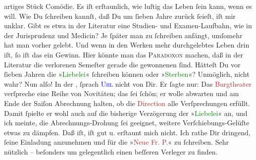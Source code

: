                artiges Stück Comödie. Es iſt erſtaunlich, wie luſtig das Leben ſein kann, wenn {\pb}es will.\pend
           \pstart
           Wie Du ſchreiben kannſt, daß Du um ſieben Jahre zurück ſeieſt, iſt mir unklar. Gibt
               es etwa in der Literatur eine Studien- und Examen-Laufbahn, wie in der Jurisprudenz
               und Medicin? Je ſpäter man zu ſchreiben anfängt, umſomehr hat man vorher gelebt. Und
               wenn in den Werken mehr durchgelebtes Leben drin iſt, ſo iſt das ein Gewinn. Hier
               könnte man das \textsc{Paradoxon} machen, daß in der Literatur die
               verlorenen Semeſter gerade die gewonnenen ſind. Hätteſt Du vor ſieben Jahren {\pb}die »\textcolor{green}{Liebelei}{}\ledrightnote{\textcolor{green}{Liebelei. Schauspiel in drei Akten}}«
               ſchreiben können oder »\textcolor{green}{Sterben}{}\ledrightnote{\textcolor{green}{Sterben. Novelle}}«? Unmöglich,
               nicht wahr? Nun alſo!\pend
           \pstart
           In der \label{K_L02748-99v}\label{K_L02748-99h}, ſprach \textsc{\textcolor{blue}{Uhl}{}\ledrightnote{\textcolor{blue}{Friedrich Uhl}}} nicht von Dir. Er ſagte nur: Das \textcolor{brown}{Burgtheater}{}\ledrightnote{\textcolor{brown}{Burgtheater}} verſpreche eine Reihe von Novitäten; das ſei ſchön; er wolle
               abwarten und am Ende der Saiſon Abrechnung halten, ob die \textcolor{brown}{Direction}{} alle Verſprechungen erfüllt.
               Damit ſpielte er wohl auch auf die bisherige Verzögerung der »\textcolor{green}{Liebelei}{}\ledrightnote{\textcolor{green}{Liebelei. Schauspiel in drei Akten}}« an, und ich meinte, {\pb}die Abrechnungs-Drohung ſei geeignet, weitere
               Verſchiebungs-Gelüſte etwas zu dämpfen.\pend
           \pstart
           Daß \label{K_L02748-7v}\label{K_L02748-7h} iſt, iſt gut u. erſtaunt mich nicht. Ich rathe Dir dringend, ſeine Einladung
               anzunehmen und für die »\textcolor{brown}{Neue Fr. P.}{}\ledrightnote{\textcolor{brown}{Neue Freie Presse}}« \label{K_L02748-6v}\label{K_L02748-6h} zu ſchreiben. Sehr nützlich – beſonders um \strikeout{\textcolor{gray}{nur glen}} gelegentlich einen beſſeren Verleger zu finden.\pend
